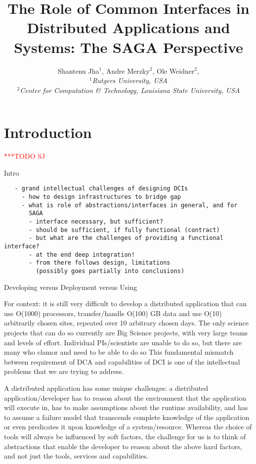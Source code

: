 \documentclass[a4paper,10pt]{article}
\newcommand{\todo}[1]{     {\textcolor{red}  { ***TODO      #1 }}}
\newcommand{\todo}[1]{}
\begin{document}
 \title{ \large \vspace{-3.5em} The Role of Common Interfaces in
   Distributed Applications and Systems: The SAGA Perspective}


 \author{\normalsize Shantenu Jha$^{1}$, Andre Merzky$^{2}$, Ole Weidner$^{2}$, \\
   \small{\emph{$^{1}$Rutgers University, USA}}\\
   \small{\emph{$^{2}$Center for Computation \& Technology, Louisiana State University, USA}}\\
 }
 \date{}
 \maketitle

 
\section{Introduction}
 \todo{SJ}
 \label{intro}

  Intro

 \begin{verbatim}
   - grand intellectual challenges of designing DCIs
     - how to design infrastructures to bridge gap
     - what is role of abstractions/interfaces in general, and for
       SAGA
       - interface necessary, but sufficient?
       - should be sufficient, if fully functional (contract)
       - but what are the challenges of providing a functional interface?
       - at the end deep integration!
       - from there follows design, limitations
         (possibly goes partially into conclusions)
 \end{verbatim}

Developing versus Deployment versus Using

For context: it is still very difficult to develop a distributed
application that can use O(1000) processors, transfer/handle O(100) GB
data and use O(10) arbitrarily chosen sites, repeated over 10
arbitrary chosen days. The only science projects that can do so
currently are Big Science projects, with very large teams and levels
of effort.  Individual PIs/scientists are unable to do so, but there
are many who clamor and need to be able to do so This fundamental
mismatch between requirement of DCA and capabilities of DCI is one of
the intellectual problems that we are trying to address.

A distributed application has some unique challenges: a distributed
application/developer has to reason about the environment that the
application will execute in, has to make assumptions about the runtime
availability, and has to assume a failure model that transcends
complete knowledge of the application or even predicates it upon
knowledge of a system/resource.  Whereas the choice of tools will
always be influenced by soft factors, the challenge for us is to think
of abstractions that enable the developer to reason about the above
hard factors, and not just the tools, services and capabilities.
\end{document}

